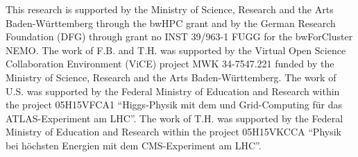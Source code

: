 %
%


\begin{acknowledgements}
This research is supported by the Ministry of Science, Research and the Arts Baden-W\"urttemberg through the bwHPC grant
and by the German Research Foundation (DFG) through grant no INST
39/963-1 FUGG for the bwForCluster NEMO.
The work of F.B. and T.H. was supported by the Virtual Open Science
Collaboration Environment (ViCE) project MWK 34-7547.221 funded by the
Ministry of Science, Research and the Arts Baden-W\"urttemberg.
The work of U.S. was supported by  the Federal Ministry of Education
and Research within the project 05H15VFCA1
``Higgs-Physik mit dem und Grid-Computing f\"ur das ATLAS-Experiment
am LHC''.
The work of T.H. was supported by the Federal Ministry of Education
and Research within the project 05H15VKCCA ``Physik bei h\"ochsten Energien mit dem CMS-Experiment
    am LHC''.
\end{acknowledgements}

